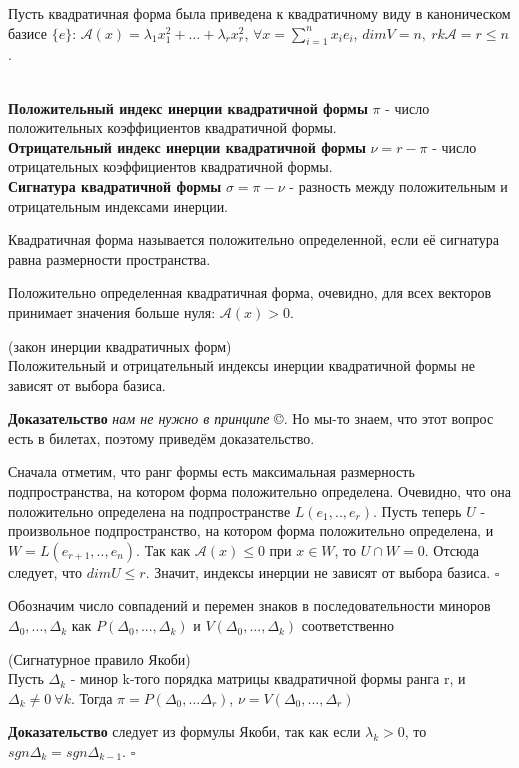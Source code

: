  Пусть квадратичная форма была приведена к квадратичному виду в каноническом 
 базисе $\{e\}$: $\mathcal A(x)=\lambda_1x_1^2+...+\lambda_rx_r^2$, $\forall
 x=\sum\limits^n_{i=1}x_ie_i$, $dimV=n,~rk\mathcal A=r\leqslant n$. 
 \begin{defin}\makebox{}\\
\textbf{Положительный индекс инерции квадратичной формы}  $\pi$ -  число 
положительных коэффициентов квадратичной формы.\\\textbf{Отрицательный индекс
инерции квадратичной формы} $\nu=r-\pi$ - число отрицательных коэффициентов 
квадратичной формы.\\\textbf{Сигнатура квадратичной формы} $\sigma=\pi-\nu$ -
разность между положительным и отрицательным индексами инерции. \end{defin}
\begin{defin}
Квадратичная форма называется положительно определенной, если её сигнатура 
равна размерности пространства.
\end{defin}
Положительно определенная квадратичная форма, очевидно, для всех векторов 
принимает значения больше нуля: $\mathcal A(x)>0$.
\begin{theor} (закон инерции квадратичных форм)\\
 Положительный и отрицательный индексы инерции квадратичной формы не зависят 
 от выбора базиса.
\end{theor}
\textbf{Доказательство} \textit{нам не нужно в принципе} \copyright. Но мы-то
знаем, что этот вопрос есть в билетах, поэтому приведём доказательство.
 
Сначала отметим, что ранг формы есть максимальная размерность  подпространства,
на котором форма положительно определена. Очевидно, что она положительно 
определена на подпространстве $L(e_1,..,e_r)$. Пусть теперь $U$ - произвольное
подпространство,
 на котором форма положительно определена, и $W=L(e_{r+1},..,e_n)$. Так как
 $\mathcal A(x)\leqslant0$ при $x\in W$, то $U\cap W=0$. Отсюда следует, что
 $dimU\leqslant r$. Значит, индексы инерции не зависят от выбора базиса.
 $\square$
 \begin{defin}
 Обозначим число совпадений и перемен знаков в последовательности миноров 
 $\Delta_0,...,\Delta_k$ как $P(\Delta_0,...,\Delta_k)$ и $V(\Delta_0,...,
 \Delta_k)$ соответственно 
 \end{defin}
 \begin{theor}\label{jacobi_rule}
 (Сигнатурное правило Якоби)\\
 Пусть $\Delta_k$ - минор k-того порядка матрицы квадратичной формы ранга r, 
 и $\Delta_k\ne0~\forall k$. Тогда $\pi=P(\Delta_0,...\Delta_r)$, $\nu=
 V(\Delta_0,...,\Delta_r)$ 
 \end{theor}
 \textbf{Доказательство} следует из формулы Якоби, так как если $\lambda_k>0$,
 то $sgn\Delta_k=sgn\Delta_{k-1}$. $\square$
